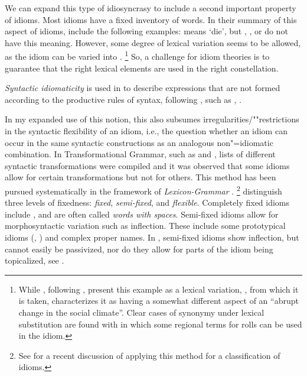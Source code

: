 \documentclass[output=paper
	        ,collection
	        ,collectionchapter
 	        ,biblatex
                ,babelshorthands
                ,newtxmath
                ,draftmode
                ,colorlinks, citecolor=brown
]{langscibook}
\begin{document}
\eal \label{trice}
\zl 

We can expand this type of idiosyncrasy to include  a second important property of idioms. 
Most idioms have a fixed inventory of words. In their summary of this aspect of idioms, \cite[--828]{Gibbs:Colston:07} include the following examples:  means `die', but , , or  do not have this meaning. However, some degree of lexical variation seems to be allowed, as
the idiom  can be varied into .%
\footnote{\label{fn-semmeln}While \citet{Gibbs:Colston:07}, following \citet{Gibbs:al:89}, present this example as a lexical variation, \cite[]{Glucksberg:01}, from which it is taken, characterizes it as having a somewhat different aspect of an ``abrupt change in the social climate''. Clear cases of synonymy under lexical substitution are found with   in which some regional terms for rolls can be used in  the idiom.}
 So, a challenge for idiom theories is to guarantee that the 
right lexical elements are used in the right constellation.

\emph{Syntactic idiomaticity} is used in \citet{Baldwin:Kim:10} to describe expressions that are not formed according to the productive rules of  syntax, following \citet{FKoC88a}, such as , .  

In my expanded use of this notion, this also subsumes irregularities/""restrictions in the syntactic flexibility of an idiom, i.e., the question whether an idiom can occur in the same syntactic constructions as an analogous non"=idiomatic combination. In Transformational Grammar, such as \citet{Weinreich:69} and \citet{Fraser:70}, lists of different syntactic transformations were compiled and it was observed that some idioms allow for certain transformations but not for others. This method has been pursued systematically in the framework of \emph{Lexicon-Grammar} \citep{Gross:82}.%
\footnote{See \citet{Laporte:18} for a recent discussion of applying this method for a classification of idioms.}
%
\citet{SBBCF2002a-ausgedruckt} distinguish three levels of fixedness: \emph{fixed}, \emph{semi-fixed}, and \emph{flexible}. 
Completely fixed idioms include ,  and are often called \emph{words with spaces}.
Semi-fixed idioms allow for morphosyntactic variation such as inflection. These include some prototypical idioms (, ) and complex proper names. In , semi-fixed idioms show inflection, but cannot easily be passivized, nor do they allow for parts of the idiom being topicalized, see .
\end{document}
